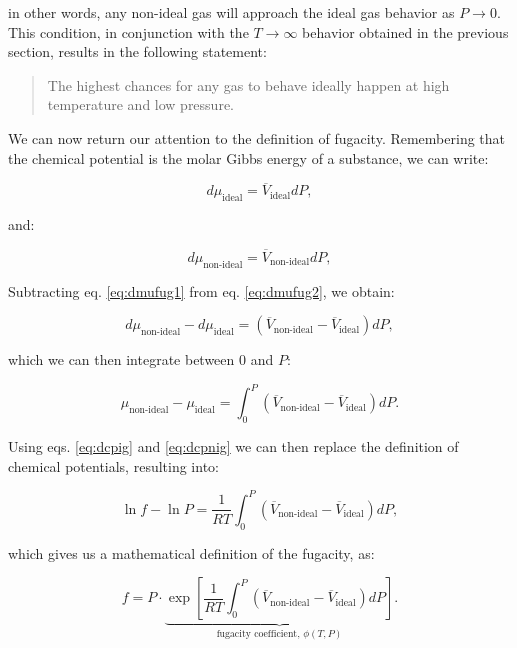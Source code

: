 \documentclass[
  9pt,
]{extbook}
\theoremstyle{definition}
\theoremstyle{definition}
\theoremstyle{definition}
\theoremstyle{definition}
\theoremstyle{remark}
\begin{document}
in other words, any non-ideal gas will approach the ideal gas behavior as \(P\rightarrow 0\). This condition, in conjunction with the \(T\rightarrow \infty\) behavior obtained in the previous section, results in the following statement:

\begin{quote}
The highest chances for any gas to behave ideally happen at high temperature and low pressure.
\end{quote}

We can now return our attention to the definition of fugacity. Remembering that the chemical potential is the molar Gibbs energy of a substance, we can write:

\begin{equation}
d \mu_{\text{ideal}} = \overline{V}_{\text{ideal}}dP,
\label{eq:dmufug1}
\end{equation}

and:

\begin{equation}
d \mu_{\text{non-ideal}} = \overline{V}_{\text{non-ideal}}dP,
\label{eq:dmufug2}
\end{equation}

Subtracting eq. \eqref{eq:dmufug1} from eq. \eqref{eq:dmufug2}, we obtain:

\begin{equation}
d \mu_{\text{non-ideal}}-d \mu_{\text{ideal}} = \left(\overline{V}_{\text{non-ideal}}-\overline{V}_{\text{ideal}} \right) dP,
\label{eq:dmufug3}
\end{equation}

which we can then integrate between \(0\) and \(P\):

\begin{equation}
\mu_{\text{non-ideal}}-\mu_{\text{ideal}} = \int_0^P \left(\overline{V}_{\text{non-ideal}}-\overline{V}_{\text{ideal}} \right) dP.
\label{eq:dmufug4}
\end{equation}

Using eqs. \eqref{eq:dcpig} and \eqref{eq:dcpnig} we can then replace the definition of chemical potentials, resulting into:

\begin{equation}
\ln f - \ln P = \frac{1}{RT} \int_0^P \left(\overline{V}_{\text{non-ideal}} - \overline{V}_{\text{ideal}} \right) dP,
\label{eq:dmufug5}
\end{equation}

which gives us a mathematical definition of the fugacity, as:

\begin{equation}
f = P \cdot \underbrace{\exp\left[ \frac{1}{RT} \int_0^P \left(\overline{V}_{\text{non-ideal}}-\overline{V}_{\text{ideal}} \right) dP \right]}_{\text{fugacity coefficient, }\phi(T,P)}.
\label{eq:dmufug6}
\end{equation}
\end{document}
